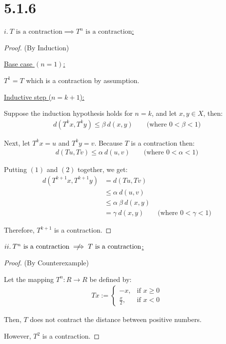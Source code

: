 \documentclass{article}
\begin{document}
\section*{5.1.6}
\setcounter{equation}{0}

\underline{$i. \: T \text{ is a contraction} \implies T^n \text{ is a contraction}$:}
\begin{proof}(By Induction)

  \underline{Base case $(n = 1)$:}

  $T^1 = T$ which is a contraction by assumption.
  \newline

  \underline{Inductive step ($n = k+1$):}

  Suppose the induction hypothesis holds for $n = k$, and let $x, y \in X$, then:
  \begin{align}
    d(T^k x, T^k y) \leq \beta \: d(x, y) \qquad \text{(where $0 < \beta < 1$)}
  \end{align}

  Next, let $T^kx = u$ and $T^k y = v$. Because $T$ is a contraction then:
  \begin{align}
    d(Tu, Tv) \leq \alpha \: d(u, v) \qquad \text{(where $0 < \alpha < 1$)}
  \end{align} 

  Putting $(1)$ and $(2)$ together, we get: 
  \begin{align*}
    d(T^{k+1}x, T^{k+1}y) &= d(Tu, Tv) \\
    &\leq \alpha \: d(u, v) \\
    &\leq \alpha \: \beta \: d(x,y) \\
    &= \gamma \: d(x,y) \qquad \text{(where $0 < \gamma < 1$)}
  \end{align*}

  Therefore, $T^{k+1}$ is a contraction.

\end{proof}

\noindent
\underline{$ii. \: T^n \text{ is a contraction} \centernot\implies T \text{ is a contraction}$:}
\begin{proof}(By Counterexample)
  $ $
  
  Let the mapping $T^n: R \longrightarrow R$ be defined by:
  \begin{align*}
    Tx := \begin{cases}
      -x, &\text{if } x \geq 0 \\
      \frac{x}{2}, &\text{if } x < 0
    \end{cases}
  \end{align*}

  Then, $T$ does not contract the distance between positive numbers.

  However, $T^2$ is a contraction.

\end{proof}
\end{document}
